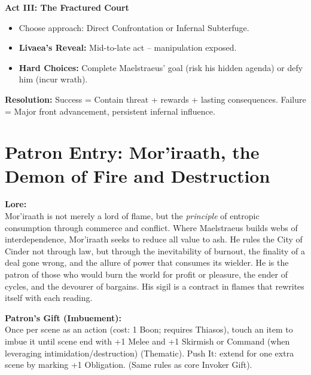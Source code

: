 \documentclass[11pt,letterpaper]{article}
\newcommand{\patronbox}[1]{\noindent\textbf{#1}\\}
\begin{document}
\textbf{Act III: The Fractured Court}
\begin{itemize}[leftmargin=*]
    \item Choose approach: Direct Confrontation or Infernal Subterfuge.
    \item \textbf{Livaea's Reveal:} Mid-to-late act -- manipulation exposed.
    \item \textbf{Hard Choices:} Complete Maelstraeus' goal (risk his hidden agenda) or defy him (incur wrath).
\end{itemize}

\textbf{Resolution:} Success = Contain threat + rewards + lasting consequences. Failure = Major front advancement, persistent infernal influence.


\section{Patron Entry: Mor'iraath, the Demon of Fire and Destruction}

\patronbox{Lore:} Mor'iraath is not merely a lord of flame, but the \textit{principle} of entropic consumption through commerce and conflict. Where Maelstraeus builds webs of interdependence, Mor'iraath seeks to reduce all value to ash. He rules the City of Cinder not through law, but through the inevitability of burnout, the finality of a deal gone wrong, and the allure of power that consumes its wielder. He is the patron of those who would burn the world for profit or pleasure, the ender of cycles, and the devourer of bargains. His sigil is a contract in flames that rewrites itself with each reading.

\patronbox{Patron's Gift (Imbuement):} Once per scene as an action (cost: 1 Boon; requires Thiasos), touch an item to imbue it until scene end with +1 Melee and +1 Skirmish or Command (when leveraging intimidation/destruction) (Thematic). Push It: extend for one extra scene by marking +1 Obligation. (Same rules as core Invoker Gift).
\end{document}

